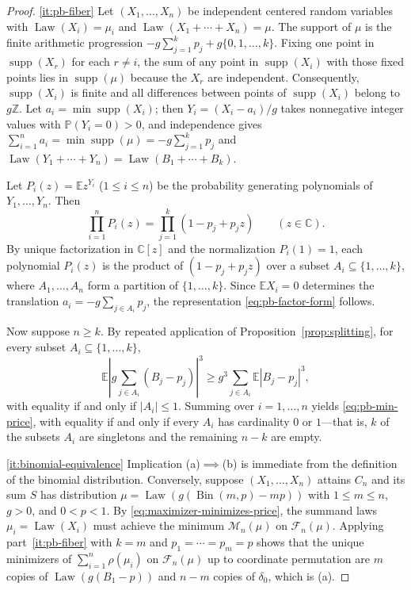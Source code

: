 \documentclass[11pt]{article}
\numberwithin{equation}{section}
\theoremstyle{definition}
\theoremstyle{remark}
\DeclareMathOperator{\supp}{supp}
\DeclareMathOperator{\Bin}{Bin}
\DeclareMathOperator{\Law}{Law}
\newcommand{\E}{\mathbb E}
\newcommand{\Pp}{\mathbb P}
\newcommand{\Z}{\mathbb Z}
\begin{document}
\begin{proof}
\ref{it:pb-fiber} Let $(X_1,\ldots,X_n)$ be independent centered random
variables with $\Law(X_i)=\mu_i$ and $\Law(X_1+\cdots+X_n)=\mu$. The support
of $\mu$ is the finite arithmetic progression
$-g\sum_{j=1}^k p_j+g\{0,1,\ldots,k\}$. Fixing one point in $\supp(X_r)$ for
each $r\ne i$, the sum of any point in $\supp(X_i)$ with those fixed points
lies in $\supp(\mu)$ because the $X_r$ are independent. Consequently,
$\supp(X_i)$ is finite and all differences between points of $\supp(X_i)$
belong to $g\Z$. Let $a_i=\min\supp(X_i)$; then $Y_i=(X_i-a_i)/g$ takes
nonnegative integer values with $\Pp(Y_i=0)>0$, and independence gives
$\sum_{i=1}^n a_i=\min\supp(\mu)=-g\sum_{j=1}^k p_j$ and
$\Law(Y_1+\cdots+Y_n)=\Law(B_1+\cdots+B_k)$.

Let $P_i(z)=\E z^{Y_i}$ ($1\le i\le n$) be the probability generating
polynomials of $Y_1,\ldots,Y_n$. Then
\[
 \prod_{i=1}^n P_i(z)=\prod_{j=1}^k(1-p_j+p_j z)\qquad(z\in\mathbb C).
\]
By unique factorization in $\mathbb C[z]$ and the normalization $P_i(1)=1$,
each polynomial $P_i(z)$ is the product of $(1-p_j+p_j z)$ over a subset
$A_i\subseteq\{1,\ldots,k\}$, where $A_1,\ldots,A_n$ form a partition of
$\{1,\ldots,k\}$. Since $\E X_i=0$ determines the translation $a_i=-g\sum_{j\in A_i}p_j$,
the representation \eqref{eq:pb-factor-form} follows.

Now suppose $n\ge k$. By repeated application of
Proposition~\ref{prop:splitting}, for every subset $A_i\subseteq\{1,\ldots,k\}$,
\[
 \E\left|g\sum_{j\in A_i}(B_j-p_j)\right|^3
 \ge g^3\sum_{j\in A_i}\E|B_j-p_j|^3,
\]
with equality if and only if $|A_i|\le1$. Summing over $i=1,\ldots,n$ yields
\eqref{eq:pb-min-price}, with equality if and only if every $A_i$ has
cardinality $0$ or $1$---that is, $k$ of the subsets $A_i$ are singletons and
the remaining $n-k$ are empty.

\ref{it:binomial-equivalence} Implication (a)$\implies$(b) is immediate from
the definition of the binomial distribution. Conversely, suppose
$(X_1,\ldots,X_n)$ attains $C_n$ and its sum $S$ has distribution
$\mu=\Law(g(\Bin(m,p)-mp))$ with $1\le m\le n$, $g>0$, and $0<p<1$. By
\eqref{eq:maximizer-minimizes-price}, the summand laws $\mu_i=\Law(X_i)$ must
achieve the minimum $\mathcal M_n(\mu)$ on $\mathcal F_n(\mu)$. Applying
part~\ref{it:pb-fiber} with $k=m$ and $p_1=\cdots=p_m=p$ shows that the
unique minimizers of $\sum_{i=1}^n\rho(\mu_i)$ on $\mathcal F_n(\mu)$ up to
coordinate permutation are $m$ copies of $\Law(g(B_1-p))$ and $n-m$ copies of
$\delta_0$, which is (a).


\end{proof}
\end{document}

